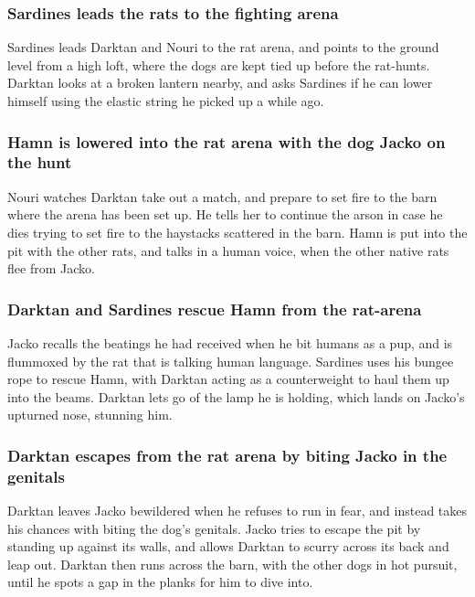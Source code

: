 \subsubsection{\Gls{Sardines} leads the rats to the fighting arena}
\Gls{Sardines} leads \Gls{Darktan} and \Gls{Nouri} to the rat arena, and points to the ground level
from a high loft, where the dogs are kept tied up before the rat-hunts. \Gls{Darktan} looks at a
broken lantern nearby, and asks \Gls{Sardines} if he can lower himself using the elastic string he
picked up a while ago.

\subsubsection{\Gls{Hamn} is lowered into the rat arena with the dog \Gls{Jacko} on the hunt}
\Gls{Nouri} watches \Gls{Darktan} take out a match, and prepare to set fire to the barn where the
arena has been set up. He tells her to continue the arson in case he dies trying to set fire to the
haystacks scattered in the barn. \Gls{Hamn} is put into the pit with the other rats, and talks in
a human voice, when the other native rats flee from \Gls{Jacko}.

\subsubsection{\Gls{Darktan} and \Gls{Sardines} rescue \Gls{Hamn} from the rat-arena}
\Gls{Jacko} recalls the beatings he had received when he bit humans as a pup, and is flummoxed by
the rat that is talking human language. \Gls{Sardines} uses his bungee rope to rescue \Gls{Hamn},
with \Gls{Darktan} acting as a counterweight to haul them up into the beams. \Gls{Darktan} lets go
of the lamp he is holding, which lands on \Gls{Jacko}'s upturned nose, stunning him.

\subsubsection{\Gls{Darktan} escapes from the rat arena by biting \Gls{Jacko} in the genitals}
\Gls{Darktan} leaves \Gls{Jacko} bewildered when he refuses to run in fear, and instead takes his
chances with biting the dog's genitals. \Gls{Jacko} tries to escape the pit by standing up against
its walls, and allows \Gls{Darktan} to scurry across its back and leap out. \Gls{Darktan} then runs
across the barn, with the other dogs in hot pursuit, until he spots a gap in the planks for him to
dive into.

